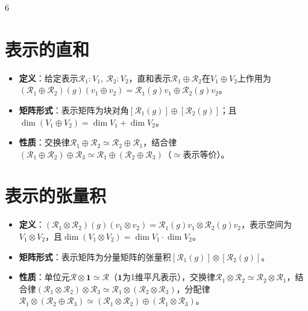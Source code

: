 \documentclass[landscape]{article}
\begin{document}
\begin{multicols*}{6}
\section*{表示的直和}
\begin{itemize}
  \item \textbf{定义}：给定表示$\mathcal R_1:V_1,\ \mathcal R_2:V_2$，直和表示$\mathcal R_1\oplus\mathcal R_2$在$V_1\oplus V_2$上作用为$(\mathcal R_1\oplus\mathcal R_2)(g)(v_1\oplus v_2)=\mathcal R_1(g)v_1\oplus\mathcal R_2(g)v_2$。
  \item \textbf{矩阵形式}：表示矩阵为块对角$[\mathcal R_1(g)]\oplus[\mathcal R_2(g)]$；且$\dim(V_1\oplus V_2)=\dim V_1+\dim V_2$。
  \item \textbf{性质}：交换律$\mathcal R_1\oplus\mathcal R_2\simeq\mathcal R_2\oplus\mathcal R_1$，结合律$(\mathcal R_1\oplus\mathcal R_2)\oplus\mathcal R_3\simeq \mathcal R_1\oplus(\mathcal R_2\oplus\mathcal R_3)$（$\simeq$表示等价）。
\end{itemize}

\section*{表示的张量积}
\begin{itemize}
  \item \textbf{定义}：$(\mathcal R_1\otimes\mathcal R_2)(g)(v_1\otimes v_2)=\mathcal R_1(g)v_1\otimes \mathcal R_2(g)v_2$，表示空间为$V_1\otimes V_2$，且$\dim(V_1\otimes V_2)=\dim V_1\cdot \dim V_2$。
  \item \textbf{矩阵形式}：表示矩阵为分量矩阵的张量积$[\mathcal R_1(g)]\otimes[\mathcal R_2(g)]$。
  \item \textbf{性质}：单位元$\mathcal R\otimes\mathbf{1}\simeq\mathcal R$（$\mathbf{1}$为1维平凡表示），交换律$\mathcal R_1\otimes\mathcal R_2\simeq\mathcal R_2\otimes\mathcal R_1$，结合律$(\mathcal R_1\otimes\mathcal R_2)\otimes\mathcal R_3\simeq\mathcal R_1\otimes(\mathcal R_2\otimes\mathcal R_3)$，分配律$\mathcal R_1\otimes(\mathcal R_2\oplus\mathcal R_3)\simeq(\mathcal R_1\otimes\mathcal R_2)\oplus(\mathcal R_1\otimes\mathcal R_3)$。
\end{itemize}


\end{multicols*}
\end{document}
